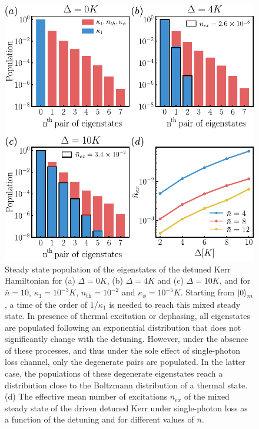 \documentclass[%
 reprint,
 superscriptaddress,
 amsmath,
 amssymb,
 aps,
 pra,
 10pt
]{revtex4-2}
\newcommand{\nbar}{\bar{n}}
\begin{document}
\begin{figure}[t!]
    \centering
    \includegraphics[width=\columnwidth]{image/thermal_state_V2.pdf}
    \vspace{-0.5cm}
    \caption{\label{fig:thermalstate}
    Steady state population of the eigenstates of the detuned Kerr Hamiltonian for (a) $\Delta = 0K$, (b) $\Delta = 4K$ and (c) $\Delta = 10K$, and for $\nbar = 10$, $\kappa_1 = 10^{-3}K$, $n_{\text{th}}=10^{-2}$ and $\kappa_\phi = 10^{-5}K$. Starting from $\ket{0}_m$, a time of the order of $1/\kappa_1$ is needed to reach this mixed steady state. In presence of thermal excitation or dephasing, all eigenstates are populated following an exponential distribution that does not significantly change with the detuning. However, under the absence of these processes, and thus under the sole effect of single-photon loss channel, only the degenerate pairs are populated. In the latter case, the populations of these degenerate eigenstates reach a distribution close to the Boltzmann distribution of a thermal state. (d) The effective mean number of excitations $\bar n_{ex}$ of the mixed steady state of the driven detuned Kerr under single-photon loss as a function of the detuning and for different values of $\nbar$. 
    }
\end{figure}
\end{document}
